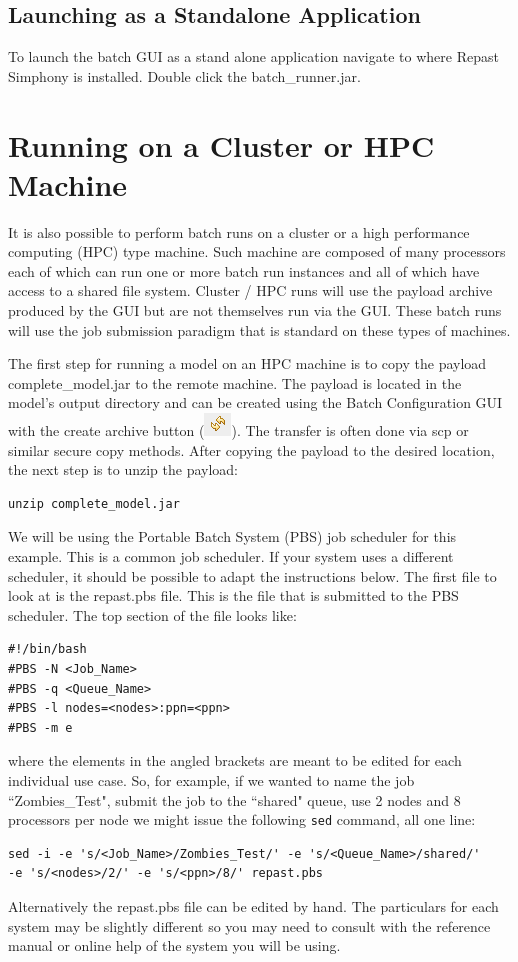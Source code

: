 \documentclass[11pt]{amsart}
\begin{document}
\subsection{Launching as a Standalone Application}
To launch the batch GUI as a stand alone application navigate to where Repast Simphony is installed. Double click the batch\_runner.jar. 
 
\section{Running on a Cluster or HPC Machine}

It is also possible to perform batch runs on a cluster or a high performance computing (HPC) type machine. Such machine are composed of many processors each of which can run one or more batch run instances and all of which have access to a shared file system. Cluster / HPC runs will use the payload archive produced by the GUI  but are not themselves run via the GUI. These batch runs will use the job submission paradigm that is standard on these types of machines.

The first step for running a model on an HPC machine is to copy the payload complete\_model.jar to the remote machine. The payload is located in the model's output directory and can be created using the Batch Configuration GUI with the create archive button (\includegraphics[height=.2in]{images/create_archive_button.png}). The transfer is often done via scp or similar secure copy methods. After copying the payload to the desired location, the next step is to unzip the payload:

\begin{verbatim}
unzip complete_model.jar
\end{verbatim}

We will be using the Portable Batch System (PBS) job scheduler for this example. This is a common job scheduler. If your system uses a different scheduler, it should be possible to adapt the instructions below. The first file to look at is the repast.pbs file. This is the file that is submitted to the PBS scheduler. The top section of the file looks like:
\begin{verbatim}
#!/bin/bash
#PBS -N <Job_Name>
#PBS -q <Queue_Name>
#PBS -l nodes=<nodes>:ppn=<ppn>
#PBS -m e
\end{verbatim}

\noindent where the elements in the angled brackets are meant to be edited for each individual use case. So, for example, if we wanted to name the job ``Zombies\_Test", submit the job to the ``shared" queue,  use 2 nodes and 8 processors per node we might issue the following \texttt{sed} command, all one line:
\begin{verbatim}
sed -i -e 's/<Job_Name>/Zombies_Test/' -e 's/<Queue_Name>/shared/'
-e 's/<nodes>/2/' -e 's/<ppn>/8/' repast.pbs
\end{verbatim}
Alternatively the repast.pbs file can be edited by hand. The particulars for each system may be slightly different so you may need to consult with the reference manual or online help of the system you will be using.
\end{document}
